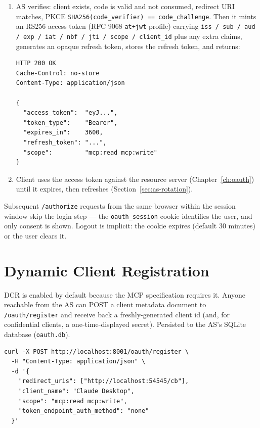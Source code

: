\begin{enumerate}
\begin{lstlisting}[style=shell]
POST /oauth/token
Content-Type: application/x-www-form-urlencoded

grant_type=authorization_code
&code=<code>
&redirect_uri=<must match step 1 exactly>
&client_id=<id>
&code_verifier=<PKCE verifier>
\end{lstlisting}

  \item AS verifies: client exists, code is valid and not consumed, redirect URI matches, PKCE \texttt{SHA256(code\_verifier) == code\_challenge}.  Then it mints an RS256 access token (RFC 9068 \texttt{at+jwt} profile) carrying \texttt{iss / sub / aud / exp / iat / nbf / jti / scope / client\_id} plus any extra claims, generates an opaque refresh token, stores the refresh token, and returns:

\begin{lstlisting}[style=shell]
HTTP 200 OK
Cache-Control: no-store
Content-Type: application/json

{
  "access_token":  "eyJ...",
  "token_type":    "Bearer",
  "expires_in":    3600,
  "refresh_token": "...",
  "scope":         "mcp:read mcp:write"
}
\end{lstlisting}

  \item Client uses the access token against the resource server (Chapter~\ref{ch:oauth}) until it expires, then refreshes (Section~\ref{sec:as-rotation}).
\end{enumerate}

Subsequent \texttt{/authorize} requests from the same browser within the session window skip the login step --- the \texttt{oauth\_session} cookie identifies the user, and only consent is shown.  Logout is implicit: the cookie expires (default 30 minutes) or the user clears it.

\section{Dynamic Client Registration}
\label{sec:as-dcr}

DCR is enabled by default because the MCP specification requires it.  Anyone reachable from the AS can POST a client metadata document to \texttt{/oauth/register} and receive back a freshly-generated client id (and, for confidential clients, a one-time-displayed secret).  Persisted to the AS's SQLite database (\texttt{oauth.db}).

\begin{lstlisting}[style=shell]
curl -X POST http://localhost:8001/oauth/register \
  -H "Content-Type: application/json" \
  -d '{
    "redirect_uris": ["http://localhost:54545/cb"],
    "client_name": "Claude Desktop",
    "scope": "mcp:read mcp:write",
    "token_endpoint_auth_method": "none"
  }'
\end{lstlisting}

